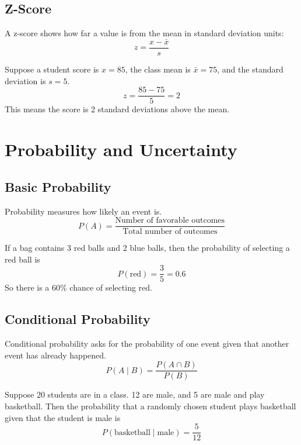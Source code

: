 \documentclass[11pt,a4paper]{article}
\begin{document}
\subsection{Z-Score}

A z-score shows how far a value is from the mean in standard deviation units:
\[
z = \frac{x - \bar{x}}{s}
\]

\begin{examplebox}
Suppose a student score is $x = 85$, the class mean is $\bar{x} = 75$, and the standard deviation is $s = 5$.
\[
z = \frac{85 - 75}{5} = 2
\]
This means the score is 2 standard deviations above the mean.
\end{examplebox}

\section{Probability and Uncertainty}

\subsection{Basic Probability}

Probability measures how likely an event is.
\[
P(A) = \frac{\text{Number of favorable outcomes}}{\text{Total number of outcomes}}
\]

\begin{examplebox}
If a bag contains 3 red balls and 2 blue balls, then the probability of selecting a red ball is
\[
P(\text{red}) = \frac{3}{5} = 0.6
\]
So there is a 60\% chance of selecting red.
\end{examplebox}

\subsection{Conditional Probability}

Conditional probability asks for the probability of one event given that another event has already happened.
\[
P(A \mid B) = \frac{P(A \cap B)}{P(B)}
\]

\begin{examplebox}
Suppose 20 students are in a class. 12 are male, and 5 are male and play basketball. Then the probability that a randomly chosen student plays basketball given that the student is male is
\[
P(\text{basketball} \mid \text{male}) = \frac{5}{12}
\]
\end{examplebox}
\end{document}
